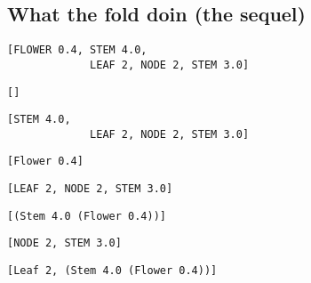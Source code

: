 \documentclass[
	aspectratio=169, 
	10pt 
]{beamer}
\begin{document}
\subsection{What the fold doin (the sequel)}
\begin{frame}[c, fragile]{\insertsubsection}
    \begin{fancycolumns}
        \centering
        \begin{lstlisting}[gobble=8]    
            [FLOWER 0.4, STEM 4.0,
             LEAF 2, NODE 2, STEM 3.0]   
        \end{lstlisting}
        \nextcolumn    
        \centering
        \begin{lstlisting}[gobble=8]     
            []
        \end{lstlisting}
    \end{fancycolumns}
\end{frame}

\begin{frame}[c, fragile]{\insertsubsection}
    \begin{fancycolumns}
        \centering
        \begin{lstlisting}[gobble=8]    
            [STEM 4.0,
             LEAF 2, NODE 2, STEM 3.0]   
        \end{lstlisting}
        \nextcolumn    
        \centering
        \begin{lstlisting}[gobble=8]     
            [Flower 0.4]
        \end{lstlisting}
    \end{fancycolumns}
\end{frame}

\begin{frame}[c, fragile]{\insertsubsection}
    \begin{fancycolumns}
        \centering
        \begin{lstlisting}[gobble=8]    
            [LEAF 2, NODE 2, STEM 3.0]   
        \end{lstlisting}
        \nextcolumn    
        \centering
        \begin{lstlisting}[gobble=8]     
            [(Stem 4.0 (Flower 0.4))]
        \end{lstlisting}
    \end{fancycolumns}
\end{frame}

\begin{frame}[c, fragile]{\insertsubsection}
    \begin{fancycolumns}[widths={40,60}]
        \centering
        \begin{lstlisting}[gobble=8]    
            [NODE 2, STEM 3.0]   
        \end{lstlisting}
        \nextcolumn    
        \centering
        \begin{lstlisting}[gobble=8]     
            [Leaf 2, (Stem 4.0 (Flower 0.4))]
        \end{lstlisting}
    \end{fancycolumns}
\end{frame}
\end{document}
